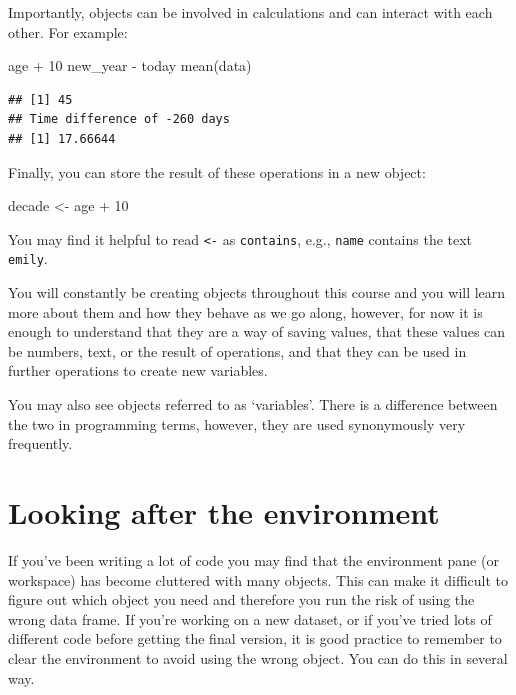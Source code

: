 \documentclass[
  oneside]{book}
\newenvironment{Shaded}{\begin{snugshade}}{\end{snugshade}}
\newcommand{\DecValTok}[1]{\textcolor[rgb]{0.00,0.00,0.81}{#1}}
\newcommand{\FunctionTok}[1]{\textcolor[rgb]{0.00,0.00,0.00}{#1}}
\newcommand{\NormalTok}[1]{#1}
\newcommand{\OtherTok}[1]{\textcolor[rgb]{0.56,0.35,0.01}{#1}}
\newcommand{\SpecialCharTok}[1]{\textcolor[rgb]{0.00,0.00,0.00}{#1}}
\begin{document}
Importantly, objects can be involved in calculations and can interact with each other. For example:

\begin{Shaded}
\begin{Highlighting}[]
\NormalTok{age }\SpecialCharTok{+} \DecValTok{10}
\NormalTok{new\_year }\SpecialCharTok{{-}}\NormalTok{ today}
\FunctionTok{mean}\NormalTok{(data)}
\end{Highlighting}
\end{Shaded}

\begin{verbatim}
## [1] 45
## Time difference of -260 days
## [1] 17.66644
\end{verbatim}

Finally, you can store the result of these operations in a new object:

\begin{Shaded}
\begin{Highlighting}[]
\NormalTok{decade }\OtherTok{\textless{}{-}}\NormalTok{ age }\SpecialCharTok{+} \DecValTok{10}
\end{Highlighting}
\end{Shaded}

\begin{try}
You may find it helpful to read \texttt{\textless{}-} as
\texttt{contains}, e.g., \texttt{name} contains the text \texttt{emily}.
\end{try}

You will constantly be creating objects throughout this course and you will learn more about them and how they behave as we go along, however, for now it is enough to understand that they are a way of saving values, that these values can be numbers, text, or the result of operations, and that they can be used in further operations to create new variables.

\begin{info}
You may also see objects referred to as `variables'. There is a
difference between the two in programming terms, however, they are used
synonymously very frequently.
\end{info}

\hypertarget{looking-after-the-environment}{%
\section{Looking after the environment}\label{looking-after-the-environment}}

If you've been writing a lot of code you may find that the environment pane (or workspace) has become cluttered with many objects. This can make it difficult to figure out which object you need and therefore you run the risk of using the wrong data frame. If you're working on a new dataset, or if you've tried lots of different code before getting the final version, it is good practice to remember to clear the environment to avoid using the wrong object. You can do this in several way.
\end{document}
